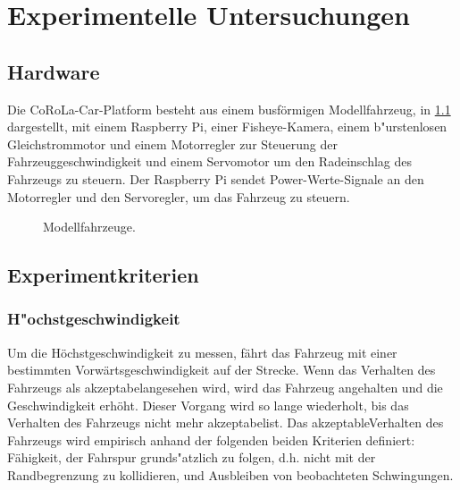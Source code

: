 \documentclass[arbeit=studie,oneside,BCOR=12mm]{ArbeitRST}
\begin{document}
\chapter{Experimentelle Untersuchungen}
\section{Hardware}

Die CoRoLa-Car-Platform besteht aus einem busförmigen Modellfahrzeug, in
\ref{cars} dargestellt, mit einem Raspberry Pi, einer Fisheye-Kamera,
einem b"urstenlosen Gleichstrommotor und einem Motorregler zur Steuerung der
Fahrzeuggeschwindigkeit und einem Servomotor um den Radeinschlag des Fahrzeugs
zu steuern. Der Raspberry Pi sendet Power-Werte-Signale an den
Motorregler und den Servoregler, um das Fahrzeug zu steuern. 

\begin{figure}[h]
    \centering
    \caption{Modellfahrzeuge.}
    \label{cars}
\end{figure}


\section{Experimentkriterien}

\subsection{H"ochstgeschwindigkeit}

Um die Höchstgeschwindigkeit zu messen, fährt das Fahrzeug mit einer bestimmten
Vorwärtsgeschwindigkeit auf der Strecke. Wenn das Verhalten des Fahrzeugs als
\glqq akzeptabel\grqq angesehen wird, wird das Fahrzeug angehalten und die
Geschwindigkeit erhöht. Dieser Vorgang wird so lange wiederholt, bis das
Verhalten des Fahrzeugs nicht mehr \glqq akzeptabel\grqq ist. Das \glqq
akzeptable\grqq Verhalten des Fahrzeugs wird empirisch anhand der folgenden
beiden Kriterien definiert: Fähigkeit, der Fahrspur grunds"atzlich zu folgen, 
d.h. nicht mit der Randbegrenzung zu kollidieren, und Ausbleiben von
beobachteten Schwingungen.
\end{document}
